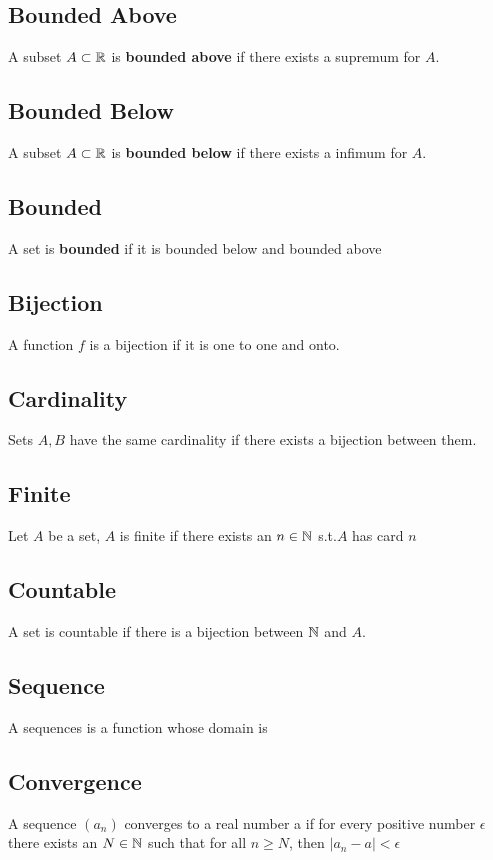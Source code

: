 \documentclass{article}
\begin{document}
\subsection{Bounded Above}
A subset $A \subset \protect\mathbb{R}$ is \textbf{bounded above} if there exists a supremum for $A$.
\subsection{Bounded Below}
A subset $A \subset \protect\mathbb{R}$ is \textbf{bounded below} if there exists a infimum for $A$.

\subsection{Bounded}
A set is \textbf{bounded} if it is bounded below and bounded above

\subsection{Bijection}
A function $f$ is a bijection if it is one to one and onto.

\subsection{Cardinality}
Sets $A,B$ have the same cardinality if there exists a bijection between them.

\subsection{Finite}
Let $A$ be a set, $A$ is finite if there exists an $n \in \protect\mathbb{N}$ s.t.$A$ has card $n$

\subsection{Countable}
A set is countable if there is a bijection between $\protect\mathbb{N}$ and $A$.

\subsection{Sequence}
A sequences is a function whose domain is \bN

\subsection{Convergence}
A sequence $(a_n)$ converges to a real number a if for every positive number $\epsilon$ there exists an $N \in \protect\mathbb{N}$ such that for all $n \ge N$, then $|a_n - a| < \epsilon$
\end{document}
